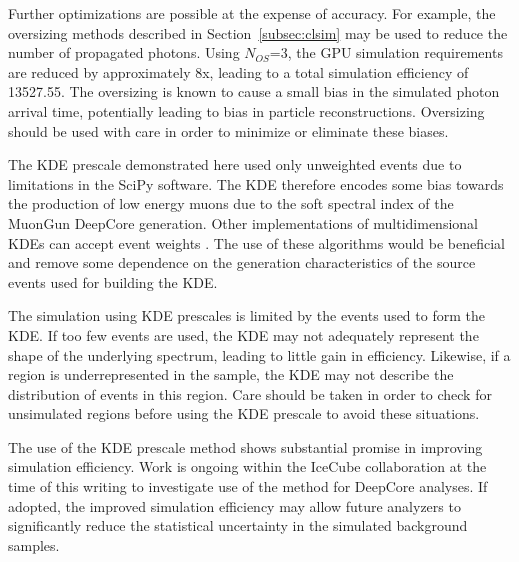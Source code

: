 Further optimizations are possible at the expense of accuracy.
For example, the oversizing methods described in Section~\ref{subsec:clsim} may be used to reduce the number of propagated photons.
Using $N_{OS}$=3, the GPU simulation requirements are reduced by approximately 8x, leading to a total simulation efficiency of 13527.55.
The oversizing is known to cause a small bias in the simulated photon arrival time, potentially leading to bias in particle reconstructions.
Oversizing should be used with care in order to minimize or eliminate these biases.

The KDE prescale demonstrated here used only unweighted events due to limitations in the SciPy software.
The KDE therefore encodes some bias towards the production of low energy muons due to the soft spectral index of the MuonGun DeepCore generation.
Other implementations of multidimensional KDEs can accept event weights \cite{Thesis-Martin, Thesis-Schoenen}.
The use of these algorithms would be beneficial and remove some dependence on the generation characteristics of the source events used for building the KDE.

The simulation using KDE prescales is limited by the events used to form the KDE.
If too few events are used, the KDE may not adequately represent the shape of the underlying spectrum, leading to little gain in efficiency.
Likewise, if a region is underrepresented in the sample, the KDE may not describe the distribution of events in this region.
Care should be taken in order to check for unsimulated regions before using the KDE prescale to avoid these situations.

The use of the KDE prescale method shows substantial promise in improving simulation efficiency.
Work is ongoing within the IceCube collaboration at the time of this writing to investigate use of the method for DeepCore analyses.
If adopted, the improved simulation efficiency may allow future analyzers to significantly reduce the statistical uncertainty in the simulated background samples.
